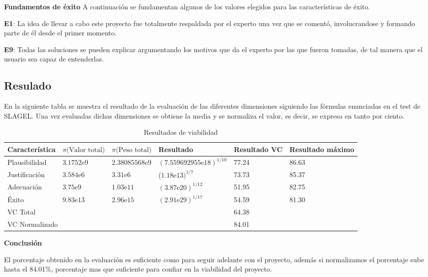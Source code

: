 \textbf{Fundamentos de éxito}
A continuación se fundamentan algunos de los valores elegidos para las características de éxito.

\begin{compactitem}
  \item[\textbf{E1}:] La idea de llevar a cabo este proyecto fue totalmente respaldada
     por el experto una vez que se comentó, involucrandose y formando parte de él desde
     el primer momento.
  \item[\textbf{E9}:] Todas las soluciones se pueden explicar argumentando los motivos
     que da el experto por las que fueron tomadas, de tal manera que el usuario sea
     capaz de entenderlas.
\end{compactitem}

\newpage
\subsection{Resulado}

En la siguiente tabla se muestra el resultado de la evaluación de las diferentes dimensiones
 siguiendo las fórmulas enunciadas en el test de SLAGEL. Una vez evaluadas dichas dimensiones
 se obtiene la media y se normaliza el valor, es decir, se expresa en tanto por ciento.

\begin{table}[htb]%
  \centering
  \caption{Resultados de viabilidad}
  \label{tab:anchura}
  \begin{tabular}{ | l | l | l | l | p{1.5cm} | p{1.5cm} | }
    \hline
    Característica & $\pi\text{(Valor total)}$ & $\pi\text{(Peso total)}$ & Resultado & Resultado VC & Resultado máximo \\ \hline \hline
    Plausibilidad & $3.1752\text{e}9$ & $2.38085568\text{e}9$ & $(7.559692955\text{e}18)^{1/10}$ & 77.24 & 86.63 \\ \hline
    Justificación & $3.584\text{e}6$  & $3.31\text{e}6$ & ($1.18\text{e}13)^{1/7}$ & 73.73 & 85.37 \\ \hline
    Adecuación & $3.75\text{e}9$ & $1.03\text{e}11$ & $(3.87\text{e}20)^{1/12}$ & 51.95 & 82.75 \\ \hline
    Éxito & $9.83\text{e}13$ & $2.96\text{e}15$ & $(2.91\text{e}29)^{1/17}$ & 54.59 & 81.30 \\ \hline \hline
    \multicolumn{4}{|l|}{VC Total} & \multicolumn{2}{l|}{64.38} \\ \hline
    \multicolumn{4}{|l|}{VC Normalizado} & \multicolumn{2}{l|}{84.01} \\ \hline

  \end{tabular}
\end{table}

\textbf{Conclusión}

El porcentaje obtenido en la evaluación es suficiente como para seguir adelante
 con el proyecto, además si normalizamos el porcentaje sube hasta el 84.01\%, porcentaje
 mas que suficiente para confiar en la viabilidad del proyecto.

